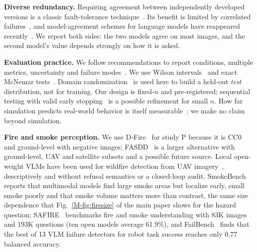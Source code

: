 \documentclass[conference]{IEEEtran}
\begin{document}
\textbf{Diverse redundancy.} Requiring agreement between independently developed versions is a classic fault-tolerance
technique~\cite{avizienis1985nversion}. Its benefit is limited by correlated failures~\cite{knight1986experimental}, and
model-agreement schemes for language models have reappeared recently~\cite{du2024debate}. We report both sides: the two
models agree on most images, and the second model's value depends strongly on how it is asked.

\textbf{Evaluation practice.} We follow recommendations to report conditions, multiple metrics, uncertainty
and failure modes~\cite{kressgazit2024empirical}. We use Wilson intervals~\cite{wilson1927probable} and exact McNemar
tests~\cite{mcnemar1947note}. Domain randomization~\cite{tobin2017domain} is used here to build a held-out \emph{test} distribution, not for training.
Our design is fixed-$n$ and pre-registered; sequential testing with valid early stopping~\cite{snyder2025policycomparison} is a possible refinement for small $n$.
How far simulation predicts real-world behavior is itself measurable~\cite{li2024simpler}; we make no claim beyond simulation.

\textbf{Fire and smoke perception.} We use D-Fire~\cite{venancio2022dfire} for study P because it is CC0 and ground-level with negative images; FASDD~\cite{wang2025fasdd}
is a larger alternative with ground-level, UAV and satellite subsets and a possible future source. Local open-weight VLMs have been used for wildfire detection from UAV imagery~\cite{seidel2025wildfirevlm},
descriptively and without refusal semantics or a closed-loop audit. SmokeBench~\cite{qi2026smokebench} reports that multimodal models find large smoke areas but localize early, small smoke poorly and that smoke volume matters more than contrast, the same size dependence that Fig.~\ref{M-fig:firesize} of the main paper shows for the hazard question; SAFIRE~\cite{li2026safire} benchmarks fire and smoke understanding with 83K images and 193K questions (ten open models average 61.9\%), and FailBench~\cite{navasardyan2026failbench} finds that the best of 13 VLM failure detectors for robot task success reaches only 0.77 balanced accuracy.
\end{document}

